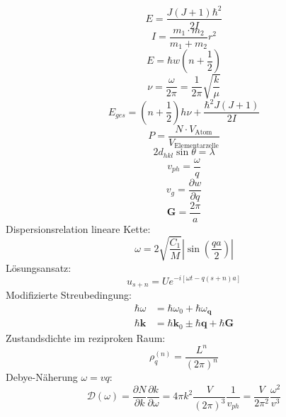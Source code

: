\documentclass[11pt]{article}
\begin{document}
\begin{equation}
  E=\frac{J(J+1)\hbar^2}{2I}
\end{equation}
\begin{equation}
  I=\frac{m_1\cdot m_2}{m_1+m_2}{r^2}
\end{equation}
\begin{equation}
  E=\hbar w(n+\frac{1}{2})
\end{equation}
\begin{equation}
  \nu=\frac{\omega}{2\pi}=\frac{1}{2\pi}\sqrt{\frac{k}{\mu}}
\end{equation}
\begin{equation}
  E_{ges}=\left(n+\frac{1}{2}\right)h\nu+\frac{\hbar^2J(J+1)}{2I}
\end{equation}
\begin{equation}
  P=\frac{N\cdot V_{\text{Atom}}}{V_{\text{Elementarzelle}}}
\end{equation}
\begin{equation}
  2d_{hkl}\sin{\theta}=\lambda
\end{equation}
\begin{equation}
  v_{ph}=\frac{\omega}{q}
\end{equation}
\begin{equation}
  v_g=\frac{\partial w}{\partial q}
\end{equation}
\begin{equation}
  \bm{G}=\frac{2\pi}{a}
\end{equation}
Dispersionsrelation lineare Kette:
\begin{equation}
  \omega=2\sqrt{\frac{C_1}{M}}\left|\sin\left(\frac{qa}{2}\right)\right|
\end{equation}
Lösungsansatz:
\begin{equation}
  u_{s+n}=Ue^{-i[\omega t-q(s+n)a]}
\end{equation}
Modifizierte Streubedingung:
\begin{equation}
  \begin{align}
    \hbar\omega&=\hbar\omega_0+\hbar\omega_{\bm{q}}\\
    \hbar\bm{k}&=\hbar\bm{k}_0\pm\hbar\bm{q}+\hbar\bm{G}
  \end{align}
\end{equation}
Zustandsdichte im reziproken Raum:
\begin{equation}
  \rho_q^{(n)}=\frac{L^{n}}{(2\pi)^n}
\end{equation}
Debye-Näherung $\omega=vq$:
\begin{equation}
  \mathcal{D}(\omega)=\frac{\partial N}{\partial k}\frac{\partial k}
  {\partial \omega}=4\pi k^2\frac{V}{(2\pi)^3}\frac{1}{v_{ph}}=
  \frac{V}{2\pi^2}\frac{\omega^2}{v^3}
\end{equation}
\end{document}
